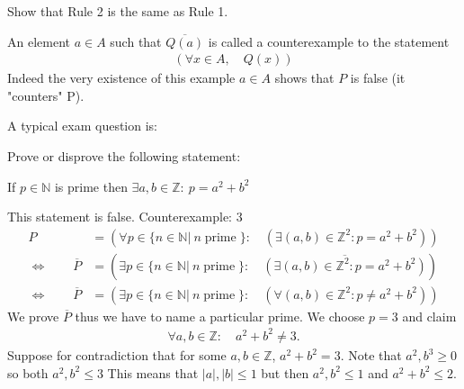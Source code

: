 \begin{ec}
Show that Rule 2 is the same as Rule 1.
\end{ec}
\begin{rk}
An element $a \in A$ such that $\overline{Q(a)}$ is called a counterexample to the statement
\begin{align*}
(\forall x \in A, \quad Q(x))
\end{align*}
Indeed the very existence of this example $a \in A$ shows that $P$ is false (it "counters" P).
\end{rk}
A typical exam question is:
\begin{qu}
	Prove or disprove the following statement: 
	
	If $p\in \mathbb N$ is prime then $\exists a,b \in \mathbb Z: ~p = a^2+b^2$
\end{qu}


\begin{an}
This statement is false. Counterexample: 3
\begin{align*}
P & = \left(\forall p \in \{n \in \mathbb N|~ n \operatorname{prime}\}: \quad \left(\exists (a,b) \in \mathbb Z^2: p = a^2+b^2\right)\right) \\
\Leftrightarrow \qquad \overline P & = \left(\exists p \in \{n \in \mathbb N|~ n \operatorname{prime}\}: \quad \overline{\left(\exists (a,b) \in \mathbb Z^2: p = a^2+b^2\right)} \right) \\
\Leftrightarrow \qquad \overline P & = \left(\exists p \in \{n \in \mathbb N|~ n \operatorname{prime}\}: \quad \left(\forall (a,b) \in \mathbb Z^2: p \neq a^2+b^2 \right) \right)
\end{align*}
We prove $\overline P$ thus we have to name a particular prime. We choose $p=3$ and claim
\begin{align*}
\forall a,b \in \mathbb Z: \quad a^2+b^2 \neq 3.
\end{align*}
Suppose for contradiction that for some $a,b\in \mathbb Z$, $a^2+b^2=3$. Note that $a^2,b^3 \geq 0$ so both $a^2,b^2 \leq 3$ This means that $|a|,|b| \leq 1$ but then $a^2,b^2 \leq 1$ and $a^2+b^2 \leq 2$. 
\end{an}
